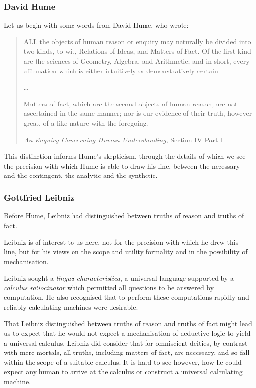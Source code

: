 \documentclass{rbjk}
\begin{document}
\begin{article}
{\subsubsection{David Hume}

Let us begin with some words from David Hume, who wrote:

\begin{quote}
 ALL the objects of human reason or enquiry may naturally be divided into two kinds, to wit, Relations of Ideas, and Matters of Fact. Of the first kind are the sciences of Geometry, Algebra, and Arithmetic; and in short, every affirmation which is either intuitively or demonstratively certain.

\ldots

 Matters of fact, which are the second objects of human reason, are not ascertained in the same manner; nor is our evidence of their truth, however great, of a like nature with the foregoing.

{\it An Enquiry Concerning Human Understanding}, Section IV Part I
\end{quote}

This distinction informs Hume's skepticism, through the details of which we see the precision with which Hume is able to draw his line, between the necessary and the contingent, the analytic and the synthetic.

\subsubsection{Gottfried Leibniz}

Before Hume, Leibniz had distinguished between truths of reason and truths of fact.

Leibniz is of interest to us here, not for the precision with which he drew this line, but for his views on the scope and utility formality and in the possibility of mechanisation.

Leibniz sought a {\it lingua characteristica}, a universal language supported by a {\it calculus ratiocinator} which permitted all questions to be answered by computation.
He also recognised that to perform these computations rapidly and reliably calculating machines were desirable.

That Leibniz distinguished between truths of reason and truths of fact might lead us to expect that he would not expect a mechanisation of deductive logic to yield a universal calculus.
Leibniz did consider that for omniscient deities, by contrast with mere mortals, all truths, including matters of fact, are necessary, and so fall within the scope of a suitable calculus.
It is hard to see however, how he could expect any human to arrive at the calculus or construct a universal calculating machine.

}
\end{article}
\end{document}
